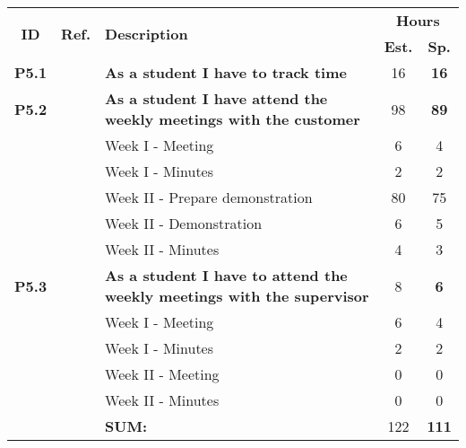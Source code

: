 \label{tab:sprint5storiesProcess}
\def\arraystretch{1.25}
 
\begin{longtable}{ccXcc}

\toprule[0.5mm]
\multirow{2}{*}{\textbf{ID}} &
\multirow{2}{*}{\textbf{Ref.}} & \multirow{2}{*}{\textbf{Description}} & \multicolumn{2}{c}{\textbf{Hours}} \\
 					& & & \textbf{Est.} & \textbf{Sp.} \\

\midrule

\textbf{P5.1} 	&& {\bf  As a student I have to track time} 										& 	16	& \textbf{16} \\
	
\textbf{P5.2} 	&& {\bf As a student I have attend the weekly meetings with the customer} 			& 	98	& \textbf{89} \\
		&& Week I - Meeting							&  6 & 4 \\
		&& Week I - Minutes							&  2 & 2 \\
		&& Week II - Prepare demonstration			&  80 & 75\\
		&& Week II - Demonstration					&  6 & 5 \\
		&& Week II - Minutes						&  4 & 3 \\


		
\textbf{P5.3} 	&& {\bf As a student I have to attend the weekly meetings with the supervisor} 		& 	8	& \textbf{6} \\
		&& Week I - Meeting							&  6 & 4 \\
		&& Week I - Minutes							&  2 & 2 \\
		&& Week II - Meeting						&  0 & 0 \\
		&& Week II - Minutes						&  0 & 0 \\

				
				
\hline
				&& \textbf{SUM:}		&		122	&  \textbf{111}
 \\																			
\bottomrule[0.5mm]
\end{longtable}
